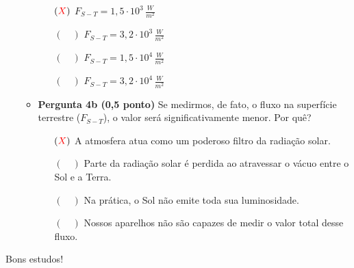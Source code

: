 \documentclass[a4paper, 12pt]{article}
\newcommand{\red}[1]{\textcolor{red}{#1}}
\begin{document}
\begin{flushleft}
\begin{itemize}
\begin{itemize}
                    \begin{itemize}
                        \item[$(\red{X})$] $F_{S-T} = 1,5·10^3 \, \frac{W}{m^2}$
                        \item[$(\quad)$] $F_{S-T} = 3,2·10^3 \, \frac{W}{m^2}$
                        \item[$(\quad)$] $F_{S-T} = 1,5·10^4 \, \frac{W}{m^2}$
                        \item[$(\quad)$] $F_{S-T} = 3,2·10^4 \, \frac{W}{m^2}$
                    \end{itemize}
                \item \textbf{Pergunta 4b (0,5 ponto)} Se medirmos, de fato, o fluxo na superfície terrestre ($F_{S-T}$), o valor será significativamente menor. Por quê?
                    \begin{itemize}
                        \item[$(\red{X})$] A atmosfera atua como um poderoso filtro da radiação solar.
                        \item[$(\quad)$] Parte da radiação solar é perdida ao atravessar o vácuo entre o Sol e a Terra.
                        \item[$(\quad)$] Na prática, o Sol não emite toda sua luminosidade.
                        \item[$(\quad)$] Nossos aparelhos não são capazes de medir o valor total desse fluxo.
                    \end{itemize}
            \end{itemize}
    \end{itemize} \end{flushleft}

    \begin{flushright}
		\begin{large}
			Bons estudos!
		\end{large}
	\end{flushright}
\end{document}
